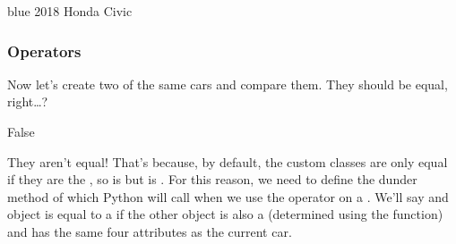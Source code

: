 \documentclass[letterpaper,10pt,english]{jupyterBook}
\begin{document}
\begin{sphinxVerbatim}[commandchars=\\\{\}]
blue 2018 Honda Civic
\end{sphinxVerbatim}


\subsubsection{Operators}
\label{\detokenize{content/07-game-theory/python-classes:operators}}
\sphinxAtStartPar
Now let’s create two of the same cars and compare them. They should be equal, right…?

\begin{sphinxVerbatim}[commandchars=\\\{\}]
     
     

  
\end{sphinxVerbatim}

\begin{sphinxVerbatim}[commandchars=\\\{\}]
False
\end{sphinxVerbatim}

\sphinxAtStartPar
They aren’t equal! That’s because, by default, the custom classes are only equal if they are the , so  is  but  is . For this reason, we need to define the  dunder method of  which Python will call when we use the \sphinxcode{\sphinxupquote{==}} operator on a . We’ll say and object is equal to a  if the other object is also a  (determined using the  function) and has the same four attributes as the current car.
\end{document}
